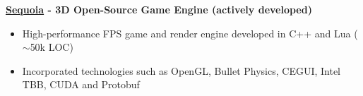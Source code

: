 \textbf{\href{https://github.com/thfabian/sequoia}{Sequoia} - 3D Open-Source Game Engine (actively developed)}
\begin{itemize}
 \item High-performance FPS game and render engine developed in C++ and Lua ($\sim$50k LOC)
 \item Incorporated technologies such as OpenGL, Bullet Physics, CEGUI, Intel TBB, CUDA and Protobuf
\end{itemize}